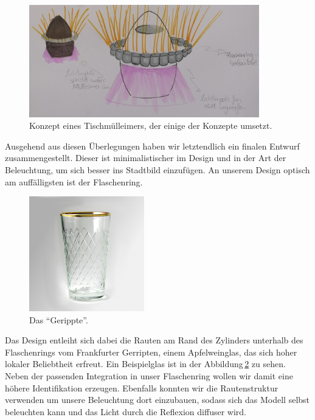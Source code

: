     \begin{figure}[H]
        \centering
        \includegraphics[width=10cm]{media/01_project/sketch_party_bin.jpg}
        \caption{Konzept eines Tischmülleimers, der einige der Konzepte umsetzt.}
        \label{fig:light_bin_1}
    \end{figure}

    Ausgehend aus diesen Überlegungen haben wir letztendlich ein finalen Entwurf zusammengestellt. Dieser ist minimalistischer im Design und in der Art der Beleuchtung, um sich besser ins Stadtbild einzufügen.
    An unserem Design optisch am auffälligsten ist der Flaschenring.

    \begin{figure}[H]
        \centering
        \includegraphics[width=5cm]{media/01_project/picture_geripptes.jpg}
        \caption{Das \enquote{Gerippte}.}
        \label{fig:picture_gerippte}
    \end{figure}

    Das Design entleiht sich dabei die Rauten am Rand des Zylinders unterhalb des Flaschenrings vom Frankfurter Gerripten, einem Apfelweinglas, das sich hoher lokaler Beliebtheit erfreut. Ein Beispielglas ist in der Abbildung\,\ref{fig:picture_gerippte} zu sehen. Neben der passenden Integration in unser Flaschenring wollen wir damit eine höhere Identifikation erzeugen.
    Ebenfalls konnten wir die Rautenstruktur verwenden um unsere Beleuchtung dort einzubauen, sodass sich das Modell selbst beleuchten kann und das Licht durch die Reflexion diffuser wird.
    
